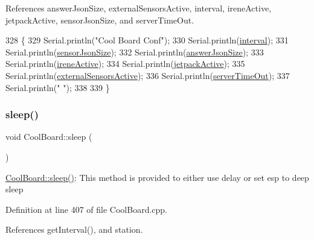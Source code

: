 References answer\+Json\+Size, external\+Sensors\+Active, interval, irene\+Active, jetpack\+Active, sensor\+Json\+Size, and server\+Time\+Out.


\begin{DoxyCode}
328 \{
329     Serial.println(\textcolor{stringliteral}{"Cool Board Conf"});
330     Serial.println(\hyperlink{classCoolBoard_a6d5c2603e162dcd6e7626a5b90f30837}{interval});
331     Serial.println(\hyperlink{classCoolBoard_a58e4b6072e3ac8b141ec0befb479208e}{sensorJsonSize});
332     Serial.println(\hyperlink{classCoolBoard_af2da1f85315b3d074a8b87d158094fb7}{answerJsonSize});
333     Serial.println(\hyperlink{classCoolBoard_a1de9b5516695b2e1668bf2e3a6701332}{ireneActive});
334     Serial.println(\hyperlink{classCoolBoard_a4dc6ff276ed178975bd8b459fa7421dc}{jetpackActive});
335     Serial.println(\hyperlink{classCoolBoard_af29860cc422622dc33614f9eabb58c40}{externalSensorsActive});
336     Serial.println(\hyperlink{classCoolBoard_a7a8d8d3d316220cdd049cd63c1aa8fe6}{serverTimeOut});
337     Serial.println(\textcolor{stringliteral}{" "});
338 
339 \}
\end{DoxyCode}
\mbox{\label{classCoolBoard_a5caa34e713c0b138e34390ddc4208fd3}} 
\subsubsection{\texorpdfstring{sleep()}{sleep()}}
{\footnotesize\ttfamily void Cool\+Board\+::sleep (\begin{DoxyParamCaption}{ }\end{DoxyParamCaption})}

\hyperlink{classCoolBoard_a5caa34e713c0b138e34390ddc4208fd3}{Cool\+Board\+::sleep()}\+: This method is provided to either use delay or set esp to deep sleep 

Definition at line 407 of file Cool\+Board.\+cpp.



References get\+Interval(), and station.


